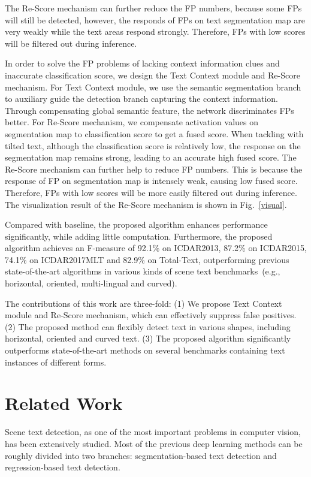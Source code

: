 \documentclass[letterpaper]{article} \usepackage{aaai19}  \usepackage{times}  \usepackage{helvet}  \usepackage{courier}  \usepackage{url}  \usepackage{graphicx}
\begin{document}
The Re-Score mechanism can further reduce the FP numbers,
because some FPs will still be detected, however, the responds of FPs on text segmentation map are very weakly while the text areas respond strongly. 
Therefore, FPs with low scores will be filtered out during inference.
\fi

In order to solve the FP problems of lacking context information clues and inaccurate classification score, we design the Text Context module and Re-Score mechanism. 
For Text Context module, we use the semantic segmentation branch to auxiliary guide the detection branch capturing the context information. Through compensating global semantic feature, the network discriminates FPs better.
For Re-Score mechanism, we compensate activation values on segmentation map to classification score to get a fused score. When tackling with tilted text, although the classification score is relatively low, the response on the segmentation map remains strong, leading to an accurate high fused score.
The Re-Score mechanism can further help to reduce FP numbers. This is because the response of FP on segmentation map is intensely weak, causing low fused score. Therefore, FPs with low scores will be more easily filtered out during inference.
The visualization result of the Re-Score mechanism is shown in Fig.~\ref{visual}.


Compared with baseline, the proposed algorithm enhances performance significantly, while adding little computation.
Furthermore, the proposed algorithm achieves an F-measure of 92.1\% on ICDAR2013, 87.2\% on ICDAR2015, 74.1\% on ICDAR2017MLT and 82.9\% on Total-Text,
outperforming previous state-of-the-art algorithms in various kinds of scene text benchmarks~(e.g., horizontal, oriented, multi-lingual and curved).

The contributions of this work are three-fold:
(1) We propose Text Context module and Re-Score mechanism, which can effectively suppress false positives. 
(2) The proposed method can flexibly detect text in various shapes, including horizontal, oriented and curved text.
(3) The proposed algorithm significantly outperforms state-of-the-art methods on several benchmarks containing text instances of different forms.



\section{Related Work}

Scene text detection, as one of the most important problems in computer vision, has been extensively studied. Most of the previous deep learning methods can be roughly divided into two branches: segmentation-based text detection and regression-based text detection. 
\end{document}
